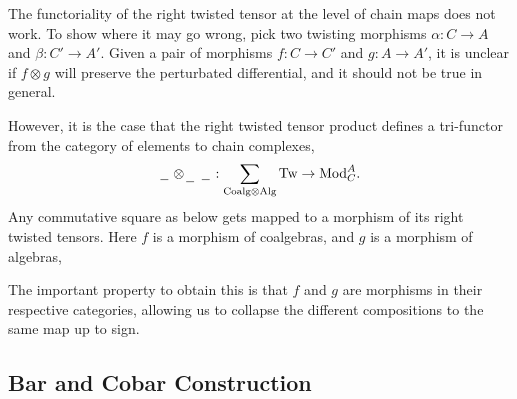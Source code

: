 \documentclass[../thesis.tex]{subfiles}
\begin{document}
            The functoriality of the right twisted tensor at the level of chain maps does not work. To show where it may go wrong, pick two twisting morphisms $\alpha: C \rightarrow A$ and $\beta: C' \rightarrow A'$. Given a pair of morphisms $f: C \rightarrow C'$ and $g: A \rightarrow A'$, it is unclear if $f\otimes g$ will preserve the perturbated differential, and it should not be true in general.

            However, it is the case that the right twisted tensor product defines a tri-functor from the category of elements to chain complexes,
            \begin{align*}
                \hspace{0.05cm}\underline{\hspace{0.2cm}}\hspace{0.05cm}\otimes_{\hspace{0.05cm}\underline{\hspace{0.2cm}}\hspace{0.05cm}}\hspace{0.05cm}\underline{\hspace{0.2cm}}\hspace{0.05cm} : \sum_{\text{Coalg}\otimes\text{Alg}}\text{Tw} \rightarrow \text{Mod}_C^A\text{.}
            \end{align*}
            Any commutative square as below gets mapped to a morphism of its right twisted tensors. Here $f$ is a morphism of coalgebras, and $g$ is a morphism of algebras,
            \begin{center}
                \quad\rightsquigarrow\quad
            \end{center}
            The important property to obtain this is that $f$ and $g$ are morphisms in their respective categories, allowing us to collapse the different compositions to the same map up to sign.


    \subsection{Bar and Cobar Construction}
\end{document}
